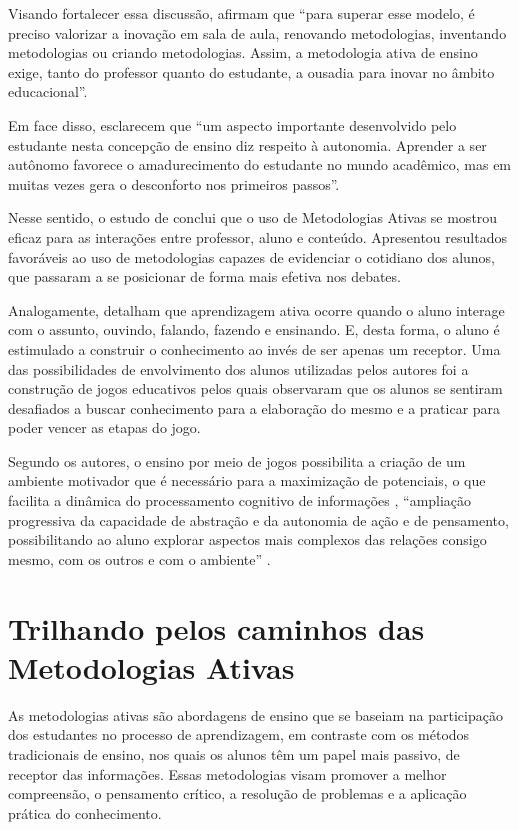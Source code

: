 Visando fortalecer essa discussão,  afirmam que ``para superar esse modelo, é preciso valorizar a inovação em sala de aula, renovando metodologias, inventando metodologias ou criando metodologias. Assim, a metodologia ativa de ensino exige, tanto do professor quanto do estudante, a ousadia para inovar no âmbito educacional''.

Em face disso,  esclarecem que ``um aspecto importante desenvolvido pelo estudante nesta concepção de ensino diz respeito à autonomia. Aprender a ser autônomo favorece o amadurecimento do estudante no mundo acadêmico, mas em muitas vezes gera o desconforto nos primeiros passos''.

Nesse sentido, o estudo de  conclui que o uso de Metodologias Ativas se mostrou eficaz para as interações entre professor, aluno e conteúdo.  Apresentou resultados favoráveis ao uso de metodologias capazes de evidenciar o cotidiano dos alunos, que passaram a se posicionar de forma mais efetiva nos debates.

Analogamente,  detalham que aprendizagem ativa ocorre quando o aluno interage com o assunto, ouvindo, falando, fazendo e ensinando. E, desta forma, o aluno é estimulado a construir o conhecimento ao invés de ser apenas um receptor. Uma das possibilidades de envolvimento dos alunos utilizadas pelos autores foi a construção de jogos educativos pelos quais observaram que os alunos se sentiram desafiados a buscar conhecimento para a elaboração do mesmo e a praticar para poder vencer as etapas do jogo.

Segundo os autores, o ensino por meio de jogos possibilita a criação de um ambiente motivador que é necessário para a maximização de potenciais, o que facilita a dinâmica do processamento cognitivo de informações  \cite{CARVALHO2021}, ``ampliação progressiva da capacidade de abstração e da autonomia de ação e de pensamento, possibilitando ao aluno explorar aspectos mais complexos das relações consigo mesmo, com os outros e com o ambiente'' \cite[p. 295]{EducacaoSecretariadeEducacaoFundamental2017} .

\section{Trilhando pelos caminhos das Metodologias Ativas}

As metodologias ativas são abordagens de ensino que se baseiam na participação dos estudantes no processo de aprendizagem, em contraste com os métodos tradicionais de ensino, nos quais os alunos têm um papel mais passivo, de receptor das informações. Essas metodologias visam promover a melhor compreensão, o pensamento crítico, a resolução de problemas e a aplicação prática do conhecimento.

